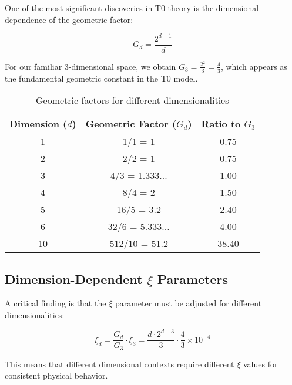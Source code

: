 \documentclass[12pt,a4paper]{article}
\newcommand{\xipar}{\ensuremath{\xi}}
\newcommand{\mytimes}{\ensuremath{\times}}
\begin{document}
	One of the most significant discoveries in T0 theory is the dimensional dependence of the geometric factor:
	
	\begin{equation}
		G_d = \frac{2^{d-1}}{d}
	\end{equation}
	
	For our familiar 3-dimensional space, we obtain $G_3 = \frac{2^2}{3} = \frac{4}{3}$, which appears as the fundamental geometric constant in the T0 model.
	
	\begin{table}[htbp]
		\centering
		\begin{tabular}{ccc}
			\toprule
			\textbf{Dimension ($d$)} & \textbf{Geometric Factor ($G_d$)} & \textbf{Ratio to $G_3$} \\
			\midrule
			1 & 1/1 = 1 & 0.75 \\
			2 & 2/2 = 1 & 0.75 \\
			3 & 4/3 = 1.333... & 1.00 \\
			4 & 8/4 = 2 & 1.50 \\
			5 & 16/5 = 3.2 & 2.40 \\
			6 & 32/6 = 5.333... & 4.00 \\
			10 & 512/10 = 51.2 & 38.40 \\
			\bottomrule
		\end{tabular}
		\caption{Geometric factors for different dimensionalities}
		\label{tab:geometric_factors}
	\end{table}
	
	\subsection{Dimension-Dependent $\xi$ Parameters}
	\label{subsec:dimension_dependent_xi}
	
	A critical finding is that the $\xipar$ parameter must be adjusted for different dimensionalities:
	
	\begin{equation}
		\xipar_d = \frac{G_d}{G_3} \cdot \xipar_3 = \frac{d \cdot 2^{d-3}}{3} \cdot \frac{4}{3} \mytimes 10^{-4}
	\end{equation}
	
	This means that different dimensional contexts require different $\xipar$ values for consistent physical behavior.
	
\end{document}

